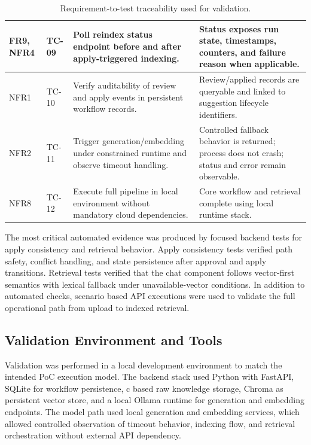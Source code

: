 \begin{table}[H]
\begin{tabular}{p{1.5cm} p{1.5cm} p{6.4cm} p{5.5cm}}
\hline
FR9, NFR4 & TC-09 & Poll reindex status endpoint before and after apply-triggered indexing. & Status exposes run state, timestamps, counters, and failure reason when applicable. \\
\hline
NFR1 & TC-10 & Verify auditability of review and apply events in persistent workflow records. & Review/applied records are queryable and linked to suggestion lifecycle identifiers. \\
\hline
NFR2 & TC-11 & Trigger generation/embedding under constrained runtime and observe timeout handling. & Controlled fallback behavior is returned; process does not crash; status and error remain observable. \\
\hline
NFR8 & TC-12 & Execute full pipeline in local environment without mandatory cloud dependencies. & Core workflow and retrieval complete using local runtime stack. \\
\hline
\end{tabular}
\caption{Requirement-to-test traceability used for validation.}
\label{tab:req_test_mapping}
\end{table}

The most critical automated evidence was produced by focused backend tests for apply consistency and retrieval behavior. Apply consistency tests verified path safety, conflict handling, and state persistence after approval and apply transitions. Retrieval tests verified that the chat component follows vector-first semantics with lexical fallback under unavailable-vector conditions. In addition to automated checks, scenario based API executions were used to validate the full operational path from upload to indexed retrieval.

\subsection{Validation Environment and Tools}

Validation was performed in a local development environment to match the intended PoC execution model. The backend stack used Python with FastAPI, SQLite for workflow persistence, c  based raw knowledge storage, Chroma as persistent vector store, and a local Ollama runtime for generation and embedding endpoints. The model path used local generation and embedding services, which allowed controlled observation of timeout behavior, indexing flow, and retrieval orchestration without external API dependency.

\vspace{0.4cm}

